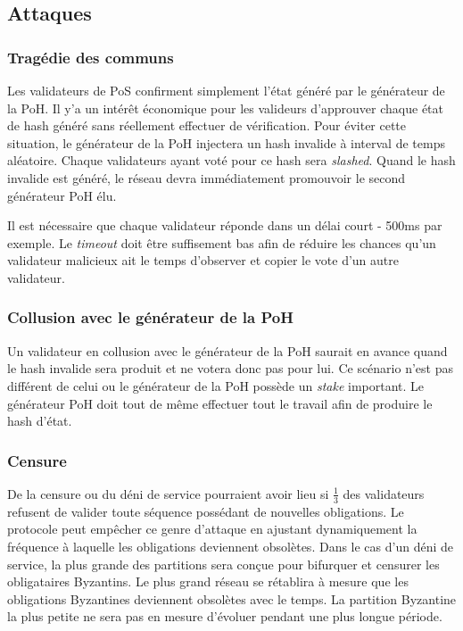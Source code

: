 \documentclass[12pt]{article}
\begin{document}
\subsection{Attaques}
\subsubsection{Tragédie des communs}
Les validateurs de PoS confirment simplement l'état généré par le générateur de la PoH. Il y'a un intérêt économique pour les valideurs d'approuver chaque état de hash généré sans réellement effectuer de vérification. Pour éviter cette situation, le générateur de la PoH injectera un hash invalide à interval de temps aléatoire. Chaque validateurs ayant voté pour ce hash sera \textit{slashed}. Quand le hash invalide est généré, le réseau devra immédiatement promouvoir le second générateur PoH élu.

Il est nécessaire que chaque validateur réponde dans un délai court - 500ms par exemple. Le \textit{timeout} doit être suffisement bas afin de réduire les chances qu'un validateur malicieux ait le temps d'observer et copier le vote d'un autre validateur.

\subsubsection{Collusion avec le générateur de la PoH}\label{subsubsec:Collision}
Un validateur en collusion avec le générateur de la PoH saurait en avance quand le hash invalide sera produit et ne votera donc pas pour lui. Ce scénario n'est pas différent de celui ou le générateur de la PoH possède un \textit{stake} important. Le générateur PoH doit tout de même effectuer tout le travail afin de produire le hash d'état.

\subsubsection{Censure}\label{Censure}
De la censure ou du déni de service pourraient avoir lieu si \(\frac{1}{3}\) des validateurs refusent de valider toute séquence possédant de nouvelles obligations. Le protocole peut empêcher ce genre d’attaque en ajustant dynamiquement la fréquence à laquelle les obligations deviennent obsolètes. Dans le cas d’un déni de service, la plus grande des partitions sera conçue pour bifurquer et censurer les obligataires Byzantins. Le plus grand réseau se rétablira à mesure que les obligations Byzantines deviennent obsolètes avec le temps. La partition Byzantine la plus petite ne sera pas en mesure d’évoluer pendant une plus longue période.
\end{document}
